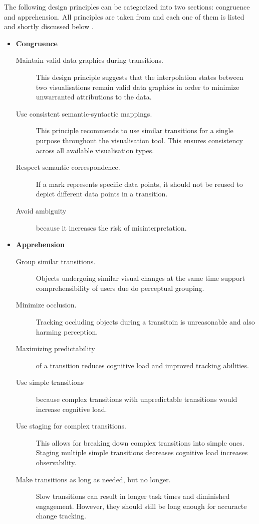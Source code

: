 The following design principles can be categorized into two sections: congruence and apprehension. All principles are taken from \citeauthor{Heer2007} and each one of them is listed and shortly discussed below .
\begin{itemize}
\item \textbf{Congruence}
\begin{description}
\item[Maintain valid data graphics during transitions.] This design principle suggests that the interpolation states between two visualisations remain valid data graphics in order to minimize unwarranted attributions to the data.
\item[Use consistent semantic-syntactic mappings.] This principle recommends to use similar transitions for a single purpose throughout the visualisation tool. This ensures consistency across all available visualisation types.
\item[Respect semantic correspondence.] If a mark represents specific data points, it should not be reused to depict different data points in a transition.
\item[Avoid ambiguity] because it increases the risk of misinterpretation.
\end{description}

\item \textbf{Apprehension}
\begin{description}
\item[Group similar transitions.] Objects undergoing similar visual changes at the same time support comprehensibility of users due do perceptual grouping.
\item[Minimize occlusion.] Tracking occluding objects during a transitoin is unreasonable and also harming perception.
\item[Maximizing predictability] of a transition reduces cognitive load and improved tracking abilities.
\item[Use simple transitions] because complex transitions with unpredictable transitions would increase cognitive load.
\item[Use staging for complex transitions.] This allows for breaking down complex transitions into simple ones. Staging multiple simple transitions decreases cognitive load increases observability.
\item[Make transitions as long as needed, but no longer.] Slow transitions can result in longer task times and diminished engagement. However, they should still be long enough for accuracte change tracking.
\end{description}

\end{itemize}

